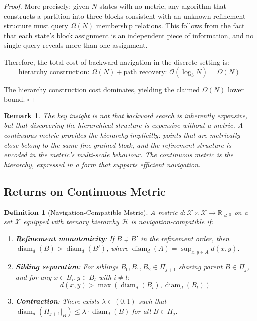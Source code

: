 \documentclass[12pt,twocolumn]{article}
\newtheorem{definition}{Definition}[section]
\newtheorem{remark}{Remark}[section]
\DeclareMathOperator{\diam}{diam}
\begin{document}
\begin{proof}
More precisely: given $N$ states with no metric, any algorithm that constructs a partition into three blocks consistent with an unknown refinement structure must query $\Omega(N)$ membership relations. This follows from the fact that each state's block assignment is an independent piece of information, and no single query reveals more than one assignment.

Therefore, the total cost of backward navigation in the discrete setting is:
\begin{equation}
\text{hierarchy construction: } \Omega(N) + \text{path recovery: } \mathcal{O}(\log_3 N) = \Omega(N)
\end{equation}

The hierarchy construction cost dominates, yielding the claimed $\Omega(N)$ lower bound. $\square$
\end{proof}

\begin{remark}
The key insight is not that backward search is inherently expensive, but that \emph{discovering the hierarchical structure} is expensive without a metric. A continuous metric provides the hierarchy implicitly: points that are metrically close belong to the same fine-grained block, and the refinement structure is encoded in the metric's multi-scale behaviour. The continuous metric \emph{is} the hierarchy, expressed in a form that supports efficient navigation.
\end{remark}

\subsection{Returns on Continuous Metric}

\begin{definition}[Navigation-Compatible Metric]
\label{def:nav_metric}
A metric $d: \mathcal{X} \times \mathcal{X} \to \mathbb{R}_{\geq 0}$ on a set $\mathcal{X}$ equipped with ternary hierarchy $\mathcal{H}$ is \emph{navigation-compatible} if:
\begin{enumerate}
\item \textbf{Refinement monotonicity}: If $B \supsetneq B'$ in the refinement order, then $\diam_d(B) > \diam_d(B')$, where $\diam_d(A) = \sup_{x,y \in A} d(x,y)$.
\item \textbf{Sibling separation}: For siblings $B_0, B_1, B_2 \in \Pi_{j+1}$ sharing parent $B \in \Pi_j$, and for any $x \in B_i, y \in B_l$ with $i \neq l$:
\begin{equation}
d(x,y) > \max(\diam_d(B_i), \diam_d(B_l))
\end{equation}
\item \textbf{Contraction}: There exists $\lambda \in (0,1)$ such that $\diam_d(\Pi_{j+1}|_B) \leq \lambda \cdot \diam_d(B)$ for all $B \in \Pi_j$.
\end{enumerate}
\end{definition}
\end{document}
